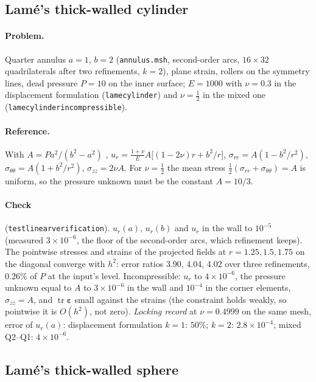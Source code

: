 \documentclass[11pt]{article}
\newcommand{\beps}{\bm{\varepsilon}}
\newcommand{\tr}{\operatorname{tr}}
\DeclareRobustCommand{\file}[1]{{\def\_{\textunderscore\allowbreak}\texttt{#1}}}
\begin{document}
\subsection{Lam\'e's thick-walled cylinder}

\paragraph{Problem.}
Quarter annulus $a = 1$, $b = 2$ (\file{annulus.msh}, second-order arcs,
$16\times32$ quadrilaterals after two refinements, $k = 2$), plane strain,
rollers on the symmetry lines, dead pressure $P = 10$ on the inner surface;
$E = 1000$ with $\nu = 0.3$ in the displacement formulation
(\file{lame\_cylinder}) and $\nu = \tfrac12$ in the mixed one
(\file{lame\_cylinder\_incompressible}).

\paragraph{Reference.}
With $A = Pa^2/(b^2 - a^2)$ \cite{timoshenko},
$u_r = \frac{1+\nu}{E}A\bigl[(1-2\nu)r + b^2/r\bigr]$,
$\sigma_{rr} = A(1 - b^2/r^2)$, $\sigma_{\theta\theta} = A(1 + b^2/r^2)$,
$\sigma_{zz} = 2\nu A$.  For $\nu = \tfrac12$ the mean stress
$\tfrac12(\sigma_{rr} + \sigma_{\theta\theta}) = A$ is uniform, so the
pressure unknown must be the constant $A = 10/3$.

\paragraph{Check} (\file{test\_linear\_verification}).
$u_r(a)$, $u_r(b)$ and $u_r$ in the wall to $10^{-5}$ (measured
$3\times10^{-6}$, the floor of the second-order arcs, which refinement
keeps).  The pointwise stresses and strains of the projected fields at
$r = 1.25, 1.5, 1.75$ on the diagonal converge with $h^2$: error ratios
3.90, 4.04, 4.02 over three refinements, $0.26\%$ of $P$ at the input's
level.  Incompressible: $u_r$ to $4\times10^{-6}$, the pressure unknown equal
to $A$ to $3\times10^{-6}$ in the wall and $10^{-4}$ in the corner elements,
$\sigma_{zz} = A$, and $\tr\beps$ small against the strains (the constraint
holds weakly, so pointwise it is $O(h^2)$, not zero).
\emph{Locking record} at $\nu = 0.4999$ on the same mesh, error of $u_r(a)$:
displacement formulation $k = 1$: $50\%$; $k = 2$: $2.8\times10^{-4}$; mixed
Q2--Q1: $4\times10^{-6}$.

\subsection{Lam\'e's thick-walled sphere}
\end{document}
